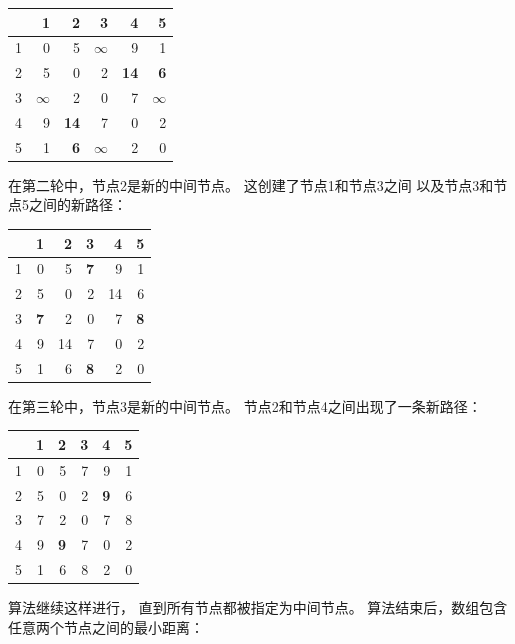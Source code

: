 \begin{center}
\begin{tabular}{r|rrrrr}
 & 1 & 2 & 3 & 4 & 5 \\
\hline
1 & 0 & 5 & $\infty$ & 9 & 1 \\
2 & 5 & 0 & 2 & \textbf{14} & \textbf{6} \\
3 & $\infty$ & 2 & 0 & 7 & $\infty$ \\
4 & 9 & \textbf{14} & 7 & 0 & 2 \\
5 & 1 & \textbf{6} & $\infty$ & 2 & 0 \\
\end{tabular}
\end{center}
\vspace{10pt}

在第二轮中，节点2是新的中间节点。
这创建了节点1和节点3之间
以及节点3和节点5之间的新路径：

\begin{center}
\begin{tabular}{r|rrrrr}
 & 1 & 2 & 3 & 4 & 5 \\
\hline
1 & 0 & 5 & \textbf{7} & 9 & 1 \\
2 & 5 & 0 & 2 & 14 & 6 \\
3 & \textbf{7} & 2 & 0 & 7 & \textbf{8} \\
4 & 9 & 14 & 7 & 0 & 2 \\
5 & 1 & 6 & \textbf{8} & 2 & 0 \\
\end{tabular}
\end{center}
\vspace{10pt}

在第三轮中，节点3是新的中间节点。
节点2和节点4之间出现了一条新路径：

\begin{center}
\begin{tabular}{r|rrrrr}
 & 1 & 2 & 3 & 4 & 5 \\
\hline
1 & 0 & 5 & 7 & 9 & 1 \\
2 & 5 & 0 & 2 & \textbf{9} & 6 \\
3 & 7 & 2 & 0 & 7 & 8 \\
4 & 9 & \textbf{9} & 7 & 0 & 2 \\
5 & 1 & 6 & 8 & 2 & 0 \\
\end{tabular}
\end{center}
\vspace{10pt}

算法继续这样进行，
直到所有节点都被指定为中间节点。
算法结束后，数组包含
任意两个节点之间的最小距离：

